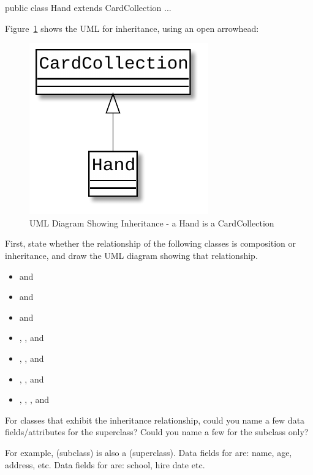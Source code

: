 \begin{exercise}
\begin{code}
public class Hand extends CardCollection {
   ...
}
\end{code}

Figure~\ref{fig.simpleInheritance} shows the UML for inheritance, using an open arrowhead:

\begin{figure}[!h]
\begin{center}
\includegraphics[scale=0.75]{figs/ch14/inheritance.pdf}
\caption{UML Diagram Showing Inheritance - a Hand is a CardCollection}
\label{fig.simpleInheritance}
\end{center}
\end{figure}

First, state whether the relationship of the following classes is composition or inheritance, and draw the UML diagram showing that relationship.

\begin{itemize}
    \item {} and 
    \item {} and 
    \item {} and 
    \item {}, , and 
    \item {}, , and 
    \item {}, , and 
    \item {}, , , and 
\end{itemize}


For classes that exhibit the inheritance relationship, could you name a few data fields/attributes for the superclass? Could you name a few for the subclass only?

For example,  (subclass) is also a  (superclass). 
Data fields for  are: name, age, address, etc.
Data fields for  are: school, hire date etc.

\end{exercise}

